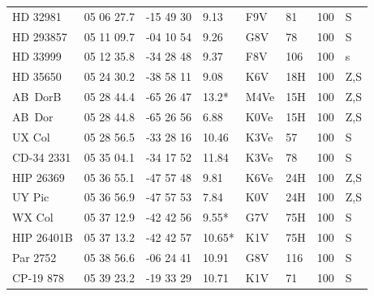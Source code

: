 \documentclass[11pt,twoside]{book}
\begin{document}
\begin{table}[]
{\begin{tabular}{l@{\hskip7pt}ccl
l@{\hskip7pt}lr@{\hskip7pt}l}
HD 32981    &05 06 27.7   &-15 49 30&     \hspace{2mm}9.13&F9V&   \hspace{2mm}81& 100&S\\
HD 293857   &05 11 09.7   &-04 10 54&     \hspace{2mm}9.26&G8V&   \hspace{2mm}78&100&S\\
HD 33999   &05 12 35.8    &-34 28 48&     \hspace{2mm}9.37      &F8V  &106&100&s\\
HD 35650   &05 24 30.2    &-38 58 11&     \hspace{2mm}9.08    &K6V& \hspace{2mm}18H&100   &Z,S\\
AB~DorB    & 05 28 44.4   &-65 26 47&       13.2*      &M4Ve &\hspace{2mm}15H&100&Z,S\\
AB~Dor     &05 28 44.8    &-65 26 56&       \hspace{2mm}6.88    &K0Ve &\hspace{2mm}15H&100&Z,S\\
UX Col    &05 28 56.5     &-33 28 16&      10.46      &K3Ve   & \hspace{2mm}57&100&S\\
CD-34 2331 &05 35 04.1    &-34 17 52&      11.84         &K3Ve   &\hspace{2mm}78& 100&S\\
HIP 26369  &05 36 55.1    &-47 57 48&       \hspace{2mm}9.81     &K6Ve  &\hspace{2mm}24H & 100&Z,S\\
UY Pic    &05 36 56.9     &-47 57 53&       \hspace{2mm}7.84     &K0V  &\hspace{2mm}24H & 100&Z,S\\
WX Col    &05 37 12.9     &-42 42 56&     \hspace{2mm}9.55*     &G7V  &\hspace{2mm}75H &100&S\\
HIP 26401B &05 37 13.2    &-42 42 57&      10.65*    &K1V   &\hspace{2mm}75H&100&S\\
Par 2752   &05 38 56.6    &-06 24 41&      10.91     &G8V   &116            &100&S\\
CP-19 878  &05 39 23.2    &-19 33 29&       10.71     &K1V   &\hspace{2mm}71 &100&S\\

\end{tabular}}
\end{table}
\end{document}
